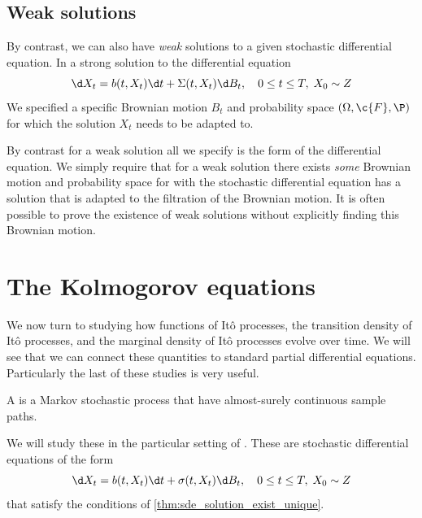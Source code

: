 \subsection{Weak solutions} 
By contrast, we can also have \emph{weak} solutions to a given stochastic differential equation.
In a strong solution to the differential equation
\[\d X_t = b(t, X_t) \d t + \Sigma(t, X_t) \d B_t, \quad 0\leq t\leq T, \; X_0 \sim Z\]
We specified a specific Brownian motion \(B_t\) and probability space \((\Omega, \c{F}, \P)\) for which the solution \(X_t\) needs to be adapted to.

By contrast for a weak solution all we specify is the form of the differential equation.
We simply require that for a weak solution there exists \emph{some} Brownian motion and probability space for with the stochastic differential equation has a solution that is adapted to the filtration of the Brownian motion.
It is often possible to prove the existence of weak solutions without explicitly finding this Brownian motion.


\section{The Kolmogorov equations}
We now turn to studying how functions of {I}t\^o processes, the transition density of {I}t\^o processes, and the marginal density of {I}t\^o processes evolve over time.
We will see that we can connect these quantities to standard partial differential equations.
Particularly the last of these studies is very useful.

A  is a Markov stochastic process that have almost-surely continuous sample paths.

We will study these in the particular setting of .
These are stochastic differential equations of the form
\[\d X_t = b(t, X_t) \d t + \sigma(t, X_t) \d B_t, \quad 0\leq t\leq T, \; X_0 \sim Z\]
that satisfy the conditions of \cref{thm:sde_solution_exist_unique}.

